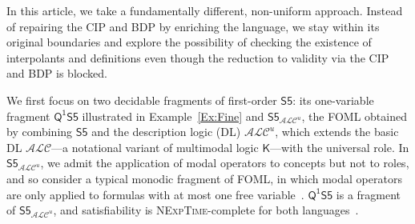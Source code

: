 \documentclass[10pt,a4paper]{amsart}
\theoremstyle{plain}
\theoremstyle{definition}
\newcommand{\nz}[1]{\textcolor{blue}{\bf!}%
	\marginpar[\parbox{15mm}{\raggedleft\scriptsize\textcolor{blue}{#1}}]%
	{\parbox{15mm}{\raggedright\scriptsize\textcolor{blue}{#1}}}}
\newcommand{\SF}{\ensuremath{\mathsf{S5}}}
\newcommand{\K}{\ensuremath{\mathsf{K}}}
\newcommand{\FOMS}{\ensuremath{\mathsf{Q^1S5}}}
\newcommand{\ALCIOS}{\ensuremath{\mathsf{S5}_{\mathcal{ALC}^u}}}
\begin{document}
In this article, we take a fundamentally different, non-uniform  approach. Instead of repairing the CIP and BDP by enriching the language, we stay within its original boundaries and explore the possibility of checking the existence of interpolants and definitions even though the reduction to validity via the CIP and BDP is blocked. 


We first focus on two decidable fragments of first-order \SF: its one-variable fragment \FOMS{} illustrated in Example~\ref{Ex:Fine} and 
\ALCIOS{}, the FOML obtained by combining \SF{} and the description logic (DL) $\mathcal{ALC}^{u}$, which extends  the basic DL $\mathcal{ALC}$---a notational variant of multimodal logic $\K$---with the universal role. In $\ALCIOS{}$, we admit the application of modal operators to concepts but not to roles, and so consider a typical monodic fragment of FOML, in which modal operators are only applied to formulas with at most one free variable~\cite{DBLP:journals/apal/HodkinsonWZ00,DBLP:journals/jsyml/WolterZ01}. \FOMS{} is a fragment of \ALCIOS{}, and satisfiability is \textsc{NExpTime}-complete for both languages~\cite{GabEtAl03}.  
\end{document}
